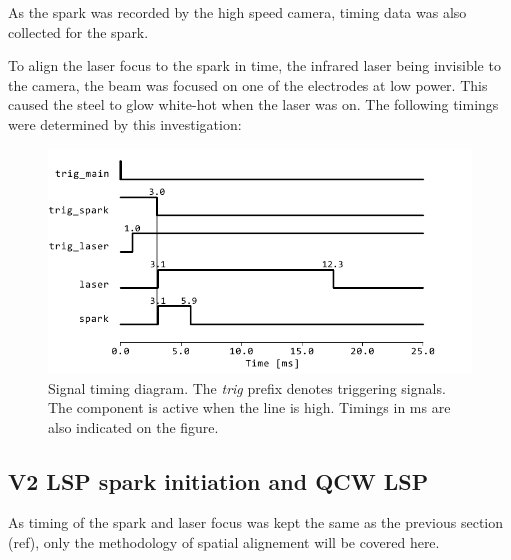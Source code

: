             As the spark was recorded by the high speed camera, timing data was also collected for the spark.
            
            To align the laser focus to the spark in time, the infrared laser being invisible to the camera, the beam was focused on one of the electrodes at low power. This caused the steel to glow white-hot when the laser was on. The following timings were determined by this investigation: 

            \begin{figure}
                \centering
                \includegraphics[width=\textwidth]{assets/4 experiments/timings.pdf}
                \caption{Signal timing diagram. The \textit{trig} prefix denotes triggering signals. The component is active when the line is high. Timings in \unit{ms} are also indicated on the figure.}
            \end{figure}



        \subsection{V2 LSP spark initiation and QCW LSP}


            As timing of the spark and laser focus was kept the same as the previous section (ref), only the methodology of spatial alignement will be covered here.


